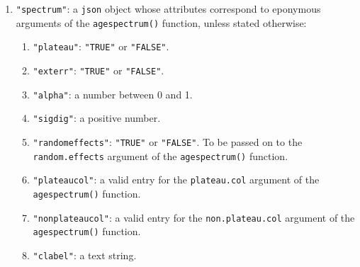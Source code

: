 \begin{refsection}
\begin{enumerate}[leftmargin=\parindent,align=left,
      labelwidth=\parindent,label*=2.\arabic*.]
\begin{enumerate}[leftmargin=\parindent,align=left,
      labelwidth=\parindent,label*=\arabic*.]
    \item{\tt "sigdig"}: a positive number.
    \item{\tt "randomeffects"}: \texttt{"TRUE"} or
      \texttt{"FALSE"}. To be passed on to the \texttt{random.effects}
      argument of \texttt{weightedmean}.
    \item{\tt "mint"}: either \texttt{"auto"} or a number to be passed
      on to the \texttt{from} argument of the \texttt{weightedmean()}
      function.
    \item{\tt "maxt"}: either \texttt{"auto"} or a number to be passed
      on to the \texttt{to} argument of the \texttt{weightedmean()}
      function.
    \item{\tt "ranked"}: \texttt{"TRUE"} or \texttt{"FALSE"}.
    \item{\tt "rectcol"}: a valid entry for the \texttt{rect.col}
      argument of the \texttt{weightedmean()} function.
    \item{\tt "outliercol"}: a valid entry for the
      \texttt{outlier.col} argument of the \texttt{weightedmean()}
      function.
    \item{\tt "clabel"}: a text string.
  \end{enumerate}  
\item{\tt "spectrum"}: a \texttt{json} object whose attributes
  correspond to eponymous arguments of the \texttt{agespectrum()}
  function, unless stated otherwise:
  \begin{enumerate}[leftmargin=\parindent,align=left,
      labelwidth=\parindent,label*=\arabic*.]
    \item{\tt "plateau"}: \texttt{"TRUE"} or \texttt{"FALSE"}.
    \item{\tt "exterr"}: \texttt{"TRUE"} or \texttt{"FALSE"}.
    \item{\tt "alpha"}: a number between 0 and 1.
    \item{\tt "sigdig"}: a positive number.
    \item{\tt "randomeffects"}: \texttt{"TRUE"} or
      \texttt{"FALSE"}. To be passed on to the \texttt{random.effects}
      argument of the \texttt{agespectrum()} function.
    \item{\tt "plateaucol"}: a valid entry for the
      \texttt{plateau.col} argument of the \texttt{agespectrum()}
      function.
    \item{\tt "nonplateaucol"}: a valid entry for the
      \texttt{non.plateau.col} argument of the \texttt{agespectrum()}
      function.
    \item{\tt "clabel"}: a text string.

\end{enumerate}
\end{enumerate}
\end{refsection}

